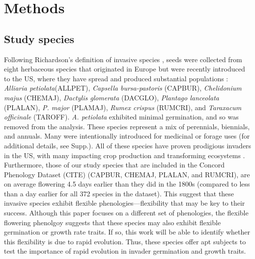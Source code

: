 \documentclass[12pt]{article}\usepackage[]{graphicx}\usepackage[]{color}
\begin{document}
	\section{Methods}
	\subsection{Study species}
Following Richardson's definition of invasive species \parencite[][, see Supp. for details]{Richardson2000, Richardson2011}, seeds were collected from eight herbaceous species that originated in Europe but were recently introduced to the US, where they have spread and produced substantial populations \parencite{Uva1997}:\textit{ Alliaria petiolata}(ALLPET), \textit{Capsella bursa-pastoris} (CAPBUR), \textit{Chelidonium majus} (CHEMAJ), \textit{Dactylis glomerata} (DACGLO),  \textit{Plantago lanceolata} (PLALAN), \textit{P.  major} (PLAMAJ), \textit{Rumex crispus} (RUMCRI), and \textit{Taraxacum officinale} (TAROFF). \textit{A. petiolata} exhibited minimal germination, and so was removed from the analysis. These species represent a mix of perennials, biennials, and annuals. Many were intentionally introduced for medicinal or forage uses (for additional details, see Supp.).  All of these species have proven prodigious invaders in the US, with many impacting crop production and transforming ecosystems \parencite[e.g.,][]{Froese2003,Wolfe2008}. 
Furthermore, those of our study species that are included in the Concord Phenology Dataset (CITE) (CAPBUR, CHEMAJ, PLALAN, and RUMCRI), are on average flowering 4.5 days earlier than they did in the 1800s (compared to less than a day earlier for all 372 species in the dataset). This suggest that these invasive species exhibit flexible phenologies---flexibility that may be key to their success. Although this paper focuses on a different set of phenologies, the flexible flowering phenolgoy suggests that these species may also exhibit flexible germination or growth rate traits. If so, this work will be able to identify whether this flexibility is due to rapid evolution. Thus, these species offer apt subjects to test the importance of rapid evolution in invader germination and growth traits. 
\end{document}
